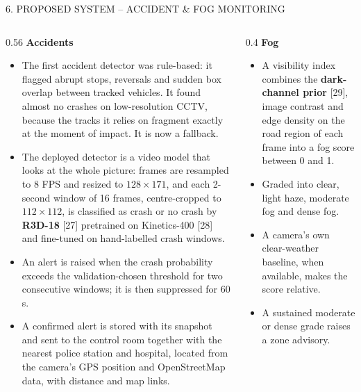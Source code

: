 \documentclass[aspectratio=169,10pt,t]{beamer}
\newcommand{\hd}[1]{{\color{dsblue}\textbf{#1}}}          %
\begin{document}
\begin{frame}{6. PROPOSED SYSTEM -- ACCIDENT \& FOG MONITORING}
\scriptsize
\begin{columns}[T,onlytextwidth]
\begin{column}{0.56\textwidth}
\hd{\small Accidents}
\begin{itemize}\setlength{\itemsep}{0.2em}
  \item The first accident detector was rule-based: it flagged abrupt stops, reversals and sudden box overlap between
        tracked vehicles. It found almost no crashes on low-resolution CCTV, because the tracks it relies on fragment
        exactly at the moment of impact. It is now a fallback.
  \item The deployed detector is a video model that looks at the whole picture: frames are resampled to 8 FPS and
        resized to $128\times171$, and each 2-second window of 16 frames, centre-cropped to $112\times112$, is
        classified as crash or no crash by \textbf{R3D-18} [27] pretrained on Kinetics-400 [28] and fine-tuned on
        hand-labelled crash windows.
  \item An alert is raised when the crash probability exceeds the validation-chosen threshold for two consecutive
        windows; it is then suppressed for 60 s.
  \item A confirmed alert is stored with its snapshot and sent to the control room together with the nearest police
        station and hospital, located from the camera's GPS position and OpenStreetMap data, with distance and map links.
\end{itemize}
\end{column}
\begin{column}{0.4\textwidth}
\hd{\small Fog}
\begin{itemize}\setlength{\itemsep}{0.2em}
  \item A visibility index combines the \textbf{dark-channel prior} [29], image contrast and edge density on the road
        region of each frame into a fog score between 0 and 1.
  \item Graded into clear, light haze, moderate fog and dense fog.
  \item A camera's own clear-weather baseline, when available, makes the score relative.
  \item A sustained moderate or dense grade raises a zone advisory.
\end{itemize}
\vspace{0.4em}

\end{column}
\end{columns}
\end{frame}
\end{document}
